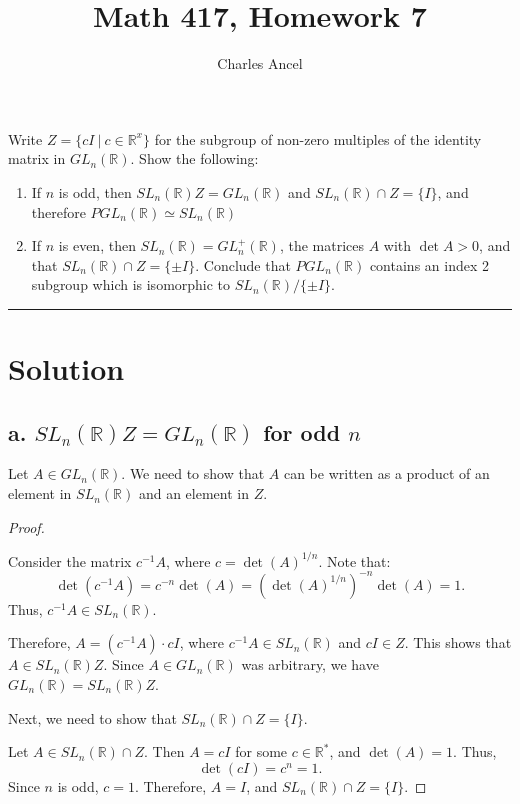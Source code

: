 \documentclass[12pt]{amsart}
\title{Math 417, Homework 7}
\author{Charles Ancel}
\theoremstyle{definition}
\numberwithin{equation}{section}
\newcommand{\R}{\mathbb{R}}
\begin{document}
\maketitle

\begin{exercise}{1} Write \(Z = \{cI \ | \ c\in \R^x\}\) for the subgroup of non-zero multiples of the identity matrix in \(GL_n(\R)\). Show the following:

    \begin{enumerate}[label=\textbf{\alph*.}]
        \item If $n$ is odd, then \(SL_n(\R)Z=GL_n(\R)\) and \(SL_n(\R) \cap Z = \{I\}\), and therefore \(PGL_n(\R) \simeq SL_n(\R)\)
        \item If $n$ is even, then \(SL_n(\R)=GL^+_n(\R)\), the matrices $A$ with \(\det A > 0\), and that \(SL_n(\R) \cap Z = \{\pm  I\}\). Conclude that \(PGL_n(\R)\) contains an index 2 subgroup which is isomorphic to \(SL_n(\R)/ \{\pm I\}\).
    \end{enumerate}

    \noindent\rule{\linewidth}{1pt}
    
    \section*{Solution}

    \subsection*{a. \(SL_n(\R)Z=GL_n(\R)\) for odd \(n\)}

    Let \(A \in GL_n(\R)\). We need to show that \(A\) can be written as a product of an element in \(SL_n(\R)\) and an element in \(Z\).

    \begin{proof} \(\)

    Consider the matrix \(c^{-1}A\), where \(c = \det(A)^{1/n}\). Note that:
    \[
    \det(c^{-1}A) = c^{-n} \det(A) = (\det(A)^{1/n})^{-n} \det(A) = 1.
    \]
    Thus, \(c^{-1}A \in SL_n(\R)\).

    Therefore, \(A = (c^{-1}A) \cdot cI\), where \(c^{-1}A \in SL_n(\R)\) and \(cI \in Z\). This shows that \(A \in SL_n(\R)Z\). Since \(A \in GL_n(\R)\) was arbitrary, we have \(GL_n(\R) = SL_n(\R)Z\).

    Next, we need to show that \(SL_n(\R) \cap Z = \{I\}\).

    Let \(A \in SL_n(\R) \cap Z\). Then \(A = cI\) for some \(c \in \R^*\), and \(\det(A) = 1\). Thus,
    \[
    \det(cI) = c^n = 1.
    \]
    Since \(n\) is odd, \(c = 1\). Therefore, \(A = I\), and \(SL_n(\R) \cap Z = \{I\}\).


\end{proof}
\end{exercise}
\end{document}
